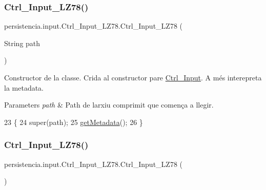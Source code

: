 \subsubsection{\texorpdfstring{Ctrl\+\_\+\+Input\+\_\+\+L\+Z78()}{Ctrl\_Input\_LZ78()}\hspace{0.1cm}{\footnotesize\ttfamily [1/2]}}
{\footnotesize\ttfamily persistencia.\+input.\+Ctrl\+\_\+\+Input\+\_\+\+L\+Z78.\+Ctrl\+\_\+\+Input\+\_\+\+L\+Z78 (\begin{DoxyParamCaption}\item[{String}]{path }\end{DoxyParamCaption})\hspace{0.3cm}{\ttfamily [inline]}}



Constructor de la classe. Crida al constructor pare \hyperlink{classpersistencia_1_1input_1_1Ctrl__Input}{Ctrl\+\_\+\+Input}. A més interepreta la metadata. 


\begin{DoxyParams}{Parameters}
{\em path} & Path de l\textquotesingle{}arxiu comprimit que comença a llegir. \\
\hline
\end{DoxyParams}

\begin{DoxyCode}
23     \{
24         super(path);
25         \hyperlink{classpersistencia_1_1input_1_1Ctrl__Input_a46e05fce164a6803820c02565c1769c8}{getMetadata}();
26     \}
\end{DoxyCode}
\mbox{\label{classpersistencia_1_1input_1_1Ctrl__Input__LZ78_acd6dce5cd53ccb3dd2d66d94ca1c3f58}} 
\subsubsection{\texorpdfstring{Ctrl\+\_\+\+Input\+\_\+\+L\+Z78()}{Ctrl\_Input\_LZ78()}\hspace{0.1cm}{\footnotesize\ttfamily [2/2]}}
{\footnotesize\ttfamily persistencia.\+input.\+Ctrl\+\_\+\+Input\+\_\+\+L\+Z78.\+Ctrl\+\_\+\+Input\+\_\+\+L\+Z78 (\begin{DoxyParamCaption}{ }\end{DoxyParamCaption})\hspace{0.3cm}{\ttfamily [inline]}}



